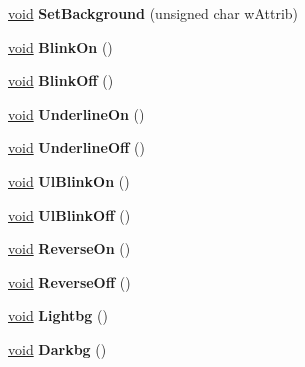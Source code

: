 \begin{DoxyCompactItemize}
\item 
\mbox{\label{class_t_console_a79fa2371d2ac511c7676dc1aa3993350}} 
\hyperlink{interfacevoid}{void} {\bfseries Set\+Background} (unsigned char w\+Attrib)
\item 
\mbox{\label{class_t_console_af10368f8cab78bf67c2dd2a8a0ce77c2}} 
\hyperlink{interfacevoid}{void} {\bfseries Blink\+On} ()
\item 
\mbox{\label{class_t_console_ae9a52cbe732ffcbb14b17ca66c7c5702}} 
\hyperlink{interfacevoid}{void} {\bfseries Blink\+Off} ()
\item 
\mbox{\label{class_t_console_aab3e81d4cc891eda077efb977052c9fb}} 
\hyperlink{interfacevoid}{void} {\bfseries Underline\+On} ()
\item 
\mbox{\label{class_t_console_aa33d009f7215cf270feeeb23d3025bba}} 
\hyperlink{interfacevoid}{void} {\bfseries Underline\+Off} ()
\item 
\mbox{\label{class_t_console_ac17a872e1786f7561cc12f0ae2bb868f}} 
\hyperlink{interfacevoid}{void} {\bfseries Ul\+Blink\+On} ()
\item 
\mbox{\label{class_t_console_aefc20de1133b0d827aac9344e7c30fba}} 
\hyperlink{interfacevoid}{void} {\bfseries Ul\+Blink\+Off} ()
\item 
\mbox{\label{class_t_console_ad41671fb5893b601cfd7cd73f4742530}} 
\hyperlink{interfacevoid}{void} {\bfseries Reverse\+On} ()
\item 
\mbox{\label{class_t_console_aecc440e2ac2f7699648e4dbfee8a26f9}} 
\hyperlink{interfacevoid}{void} {\bfseries Reverse\+Off} ()
\item 
\mbox{\label{class_t_console_ada8c51bd2087d65d0fa127422bd0e5b2}} 
\hyperlink{interfacevoid}{void} {\bfseries Lightbg} ()
\item 
\mbox{\label{class_t_console_a1805969ef37d8aa7258fa802ebbfe935}} 
\hyperlink{interfacevoid}{void} {\bfseries Darkbg} ()

\end{DoxyCompactItemize}
